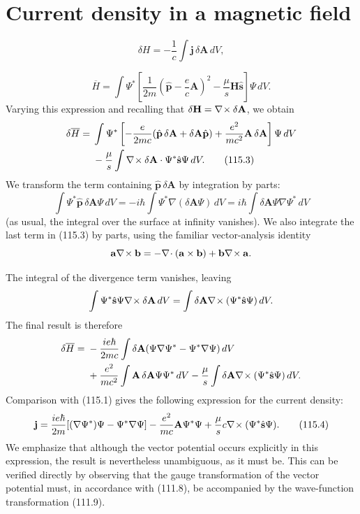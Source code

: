 \section{Current density in a magnetic field}


\begin{equation}
 \delta H=-\frac1c\int\mathbf j\,\delta\mathbf A\,dV,
 \tag{115.1}
\end{equation}

\begin{equation}
 \overline H=\int\Psi^*\left[
 \frac1{2m}\left(\hat{\mathbf p}-\frac ec\mathbf A\right)^2
 -\frac\mu s\mathbf H\hat{\mathbf s}\right]\Psi\,dV.
 \tag{115.2}
\end{equation}
Varying this expression and recalling that
$\delta\mathbf H=\nabla\!\times \delta\mathbf A$, we obtain
\begin{align}
 \delta\overline H={}&\int\Psi^*\left[-\frac e{2mc}
 (\hat{\mathbf p}\,\delta\mathbf A+\delta\mathbf A\hat{\mathbf p})
 +\frac{e^2}{mc^2}\mathbf A\,\delta\mathbf A\right]\Psi\,dV\notag\\
 &-\frac\mu s\int\nabla\!\times \delta\mathbf A\cdot
 \Psi^*\hat{\mathbf s}\Psi\,dV.
 \tag{115.3}
\end{align}
We transform the term containing $\hat{\mathbf p}\,\delta\mathbf A$ by
integration by parts:
\[
 \int\Psi^*\hat{\mathbf p}\,\delta\mathbf A\Psi\,dV
 =-i\hbar\int\Psi^*\nabla(\delta\mathbf A\Psi)\,dV
 =i\hbar\int\delta\mathbf A\Psi\nabla\Psi^*\,dV
\]
(as usual, the integral over the surface at infinity vanishes). We also
integrate the last term in (115.3) by parts, using the familiar vector-analysis
identity
\[
 \mathbf a\nabla\!\times \mathbf b
 =-\nabla\!\cdot (\mathbf a\times\mathbf b)
 +\mathbf b\nabla\!\times \mathbf a.
\]

The integral of the divergence term vanishes, leaving
\[
 \int\Psi^*\hat{\mathbf s}\Psi\nabla\!\times \delta\mathbf A\,dV
 =\int\delta\mathbf A\nabla\!\times (\Psi^*\hat{\mathbf s}\Psi)\,dV.
\]
The final result is therefore
\begin{align*}
 \delta\overline H={}&-\frac{ie\hbar}{2mc}\int\delta\mathbf A
 (\Psi\nabla\Psi^*-\Psi^*\nabla\Psi)\,dV\\
 &+\frac{e^2}{mc^2}\int\mathbf A\,\delta\mathbf A\Psi\Psi^*\,dV
 -\frac\mu s\int\delta\mathbf A\nabla\!\times (\Psi^*\hat{\mathbf s}\Psi)\,dV.
\end{align*}
Comparison with (115.1) gives the following expression for the current
density:
\begin{equation}
 \mathbf j=\frac{ie\hbar}{2m}
 [ (\nabla\Psi^*)\Psi-\Psi^*\nabla\Psi]
 -\frac{e^2}{mc}\mathbf A\Psi^*\Psi
 +\frac\mu s c\nabla\!\times (\Psi^*\hat{\mathbf s}\Psi).
 \tag{115.4}
\end{equation}
We emphasize that although the vector potential occurs explicitly in this
expression, the result is nevertheless unambiguous, as it must be. This can be
verified directly by observing that the gauge transformation of the vector
potential must, in accordance with (111.8), be accompanied by the wave-function
transformation (111.9).

